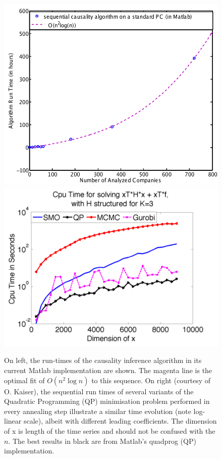 \documentclass[a0,portrait]{a0poster}
\begin{document}
\begin{multicols}{2}
\begin{figure}[H]
\begin{center} \centerline{
\includegraphics[width=14cm]{run_time_causality_inference.png}
\includegraphics[width=17cm]{Kaiser_structured_smo_mcmc_qp_gurobi_K3.png}
}
 \caption{On left, the run-times of the causality inference algorithm in
its current Matlab implementation are shown. The
magenta line is the optimal fit of $O(n^2 \log n)$ to this sequence.  On right (courtesy of O. Kaiser), the sequential run times of several variants of the Quadratic Programming (QP) minimisation problem performed in every annealing step illustrate a similar time evolution (note log-linear scale), albeit with different leading coefficients. The dimension of x is length of the time series and should not be confused with the $n$. The best results in black are from Matlab's quadprog (QP) implementation.  }
 \end{center} \label{fig:perf}
\end{figure}


\end{multicols}
\end{document}
